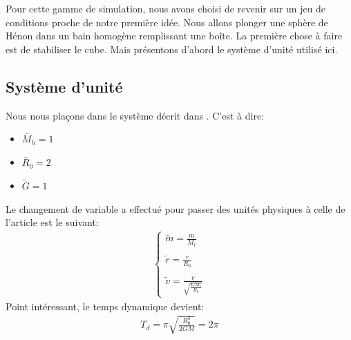 Pour cette gamme de simulation, nous avons choisi de revenir sur un jeu de conditions proche de notre première idée. Nous allons plonger une sphère de Hénon dans un bain homogène remplissant une boîte.
La première chose à faire est de stabiliser le cube. Mais présentons d'abord le système d'unité utilisé ici.

\subsection{Système d'unité}
	\label{simu::sec::unit}
	Nous nous plaçons dans le système décrit dans \cite{1983PASJ...35..547F}. C'est à dire:
	\begin{itemize}
		\item $\tilde{M_h} = 1$
		\item $\tilde{R_0} = 2$
		\item $\tilde{G} = 1$
	\end{itemize}

	Le changement de variable a effectué pour passer des unités physiques à celle de l'article est le suivant:
	\begin{align}
		\begin{cases}
			\tilde{m} = \frac{m}{M_t} \\
			\\
			\tilde{r} = \frac{r}{R_0} \\
			\\
			\tilde{v} = \frac{v}{\sqrt{\frac{GM_t}{R_0}}}
		\end{cases}
	\end{align}
	Point intéressant, le temps dynamique devient:
	\begin{align}
		T_d = \pi \sqrt{\frac{R_0^3}{2GM}} = 2\pi
	\end{align}

